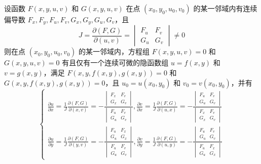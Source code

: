 \begin{theorem}[雅可比行列式]
    设函数 $F(x,y,u,v)$ 和 $G(x,y,u,v)$ 在点 $(x_0,y_0,u_0,v_0)$ 的某一邻域内有连续偏导数 $F_{x},F_{y},F_{u},F_{v},G_{x},G_{y},G_{u},G_{v}$，且
    \begin{equation}
        J= \frac{\partial(F,G)}{\partial(u,v)}=\begin{vmatrix}
            F_{u} & F_{v} \\
            G_{u} & G_{v}
        \end{vmatrix}\neq 0
    \end{equation}
    则在点 $(x_0,y_0,u_0,v_0)$ 的某一邻域内，方程组 $F(x,y,u,v)=0$ 和 $G(x,y,u,v)=0$ 有且仅有一个连续可微的隐函数组 $u=f(x,y)$ 和 $v=g(x,y)$，满足 $F(x,y,f(x,y),g(x,y))=0$ 和 $G(x,y,f(x,y),g(x,y))=0$，且 $u_0=u(x_0,y_0)$ 和 $v_0=v(x_0,y_0)$，并有
    \begin{equation}
        \begin{cases}
            \frac{\partial u}{\partial x}=\frac{1}{J}\frac{\partial(F,G)}{\partial(x,v)}=-\frac{\begin{vmatrix} F_{x} & F_{v} \\ G_{x} & G_{v} \end{vmatrix}}{\begin{vmatrix} F_{u} & F_{v} \\ G_{u} & G_{v} \end{vmatrix}} , \frac{\partial v}{\partial x}=\frac{1}{J}\frac{\partial(F,G)}{\partial(u,x)}=-\frac{\begin{vmatrix} F_{u} & F_{v} \\ G_{u} & G_{v} \end{vmatrix}}{\begin{vmatrix} F_{x} & F_{v} \\ G_{x} & G_{v} \end{vmatrix}} \\
            \frac{\partial u}{\partial y}=\frac{1}{J}\frac{\partial(F,G)}{\partial(y,v)}=-\frac{\begin{vmatrix} F_{u} & F_{x} \\ G_{u} & G_{x} \end{vmatrix}}{\begin{vmatrix} F_{u} & F_{v} \\ G_{u} & G_{v} \end{vmatrix}} , \frac{\partial v}{\partial y}=\frac{1}{J}\frac{\partial(F,G)}{\partial(u,y)}=-\frac{\begin{vmatrix} F_{u} & F_{v} \\ G_{u} & G_{v} \end{vmatrix}}{\begin{vmatrix} F_{u} & F_{x} \\ G_{u} & G_{x} \end{vmatrix}}
        \end{cases}
    \end{equation}
\end{theorem}